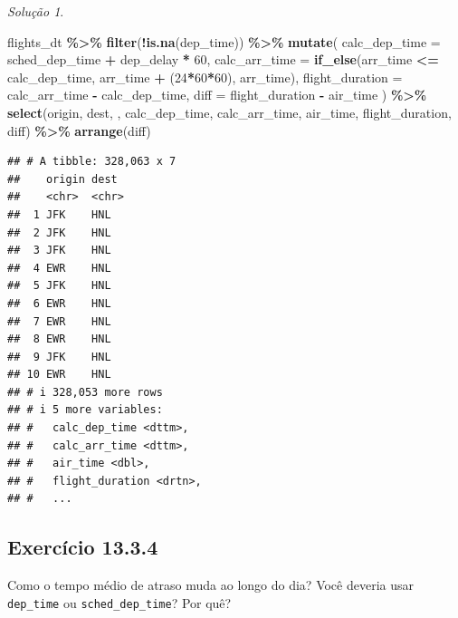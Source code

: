 \documentclass[
]{latex/krantz}
\newenvironment{Shaded}{\begin{snugshade}}{\end{snugshade}}
\newcommand{\AttributeTok}[1]{\textcolor[rgb]{0.13,0.29,0.53}{#1}}
\newcommand{\DecValTok}[1]{\textcolor[rgb]{0.00,0.00,0.81}{#1}}
\newcommand{\FunctionTok}[1]{\textcolor[rgb]{0.13,0.29,0.53}{\textbf{#1}}}
\newcommand{\NormalTok}[1]{#1}
\newcommand{\SpecialCharTok}[1]{\textcolor[rgb]{0.81,0.36,0.00}{\textbf{#1}}}
\theoremstyle{definition}
\theoremstyle{definition}
\theoremstyle{definition}
\theoremstyle{definition}
\theoremstyle{remark}
\newtheorem*{solution}{Solução}
\begin{document}
\begin{solution}
\begin{Shaded}
\begin{Highlighting}[]
\NormalTok{flights\_dt }\SpecialCharTok{\%\textgreater{}\%}
  \FunctionTok{filter}\NormalTok{(}\SpecialCharTok{!}\FunctionTok{is.na}\NormalTok{(dep\_time)) }\SpecialCharTok{\%\textgreater{}\%}
  \FunctionTok{mutate}\NormalTok{(}
    \AttributeTok{calc\_dep\_time =}\NormalTok{ sched\_dep\_time }\SpecialCharTok{+}\NormalTok{ dep\_delay }\SpecialCharTok{*} \DecValTok{60}\NormalTok{,}
    \AttributeTok{calc\_arr\_time =} \FunctionTok{if\_else}\NormalTok{(arr\_time }\SpecialCharTok{\textless{}=}\NormalTok{ calc\_dep\_time, arr\_time }\SpecialCharTok{+}\NormalTok{ (}\DecValTok{24}\SpecialCharTok{*}\DecValTok{60}\SpecialCharTok{*}\DecValTok{60}\NormalTok{), arr\_time),}
    \AttributeTok{flight\_duration =}\NormalTok{ calc\_arr\_time }\SpecialCharTok{{-}}\NormalTok{ calc\_dep\_time,}
    \AttributeTok{diff =}\NormalTok{ flight\_duration }\SpecialCharTok{{-}}\NormalTok{ air\_time}
\NormalTok{  ) }\SpecialCharTok{\%\textgreater{}\%}
  \FunctionTok{select}\NormalTok{(origin, dest, , calc\_dep\_time, calc\_arr\_time, air\_time, flight\_duration, diff) }\SpecialCharTok{\%\textgreater{}\%}
  \FunctionTok{arrange}\NormalTok{(diff)}
\end{Highlighting}
\end{Shaded}

\begin{verbatim}
## # A tibble: 328,063 x 7
##    origin dest 
##    <chr>  <chr>
##  1 JFK    HNL  
##  2 JFK    HNL  
##  3 JFK    HNL  
##  4 EWR    HNL  
##  5 JFK    HNL  
##  6 EWR    HNL  
##  7 EWR    HNL  
##  8 EWR    HNL  
##  9 JFK    HNL  
## 10 EWR    HNL  
## # i 328,053 more rows
## # i 5 more variables:
## #   calc_dep_time <dttm>,
## #   calc_arr_time <dttm>,
## #   air_time <dbl>,
## #   flight_duration <drtn>,
## #   ...
\end{verbatim}

\end{solution}

\hypertarget{exr13-3-4}{%
\subsection*{Exercício 13.3.4}\label{exr13-3-4}}

Como o tempo médio de atraso muda ao longo do dia? Você deveria usar \texttt{dep\_time} ou \texttt{sched\_dep\_time}? Por quê?
\end{document}
